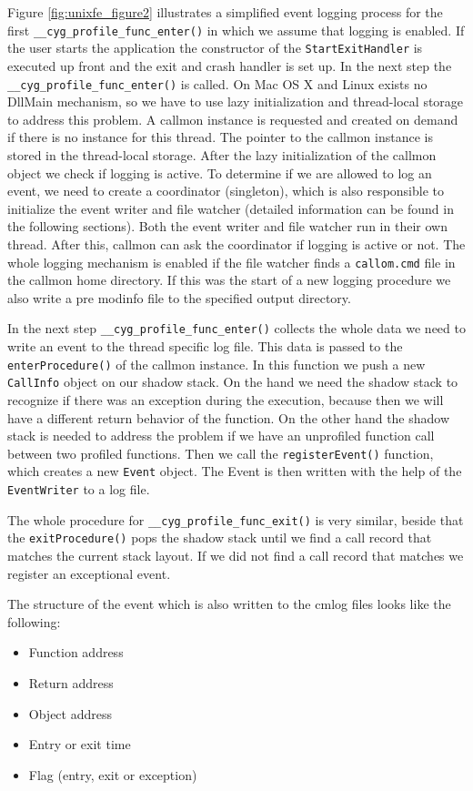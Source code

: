 Figure \ref{fig:unixfe_figure2} illustrates a simplified event logging process for the first \verb=__cyg_profile_func_enter()= in which we assume that logging is enabled. If the user starts the application the constructor of the \verb=StartExitHandler= is executed up front and the exit and crash handler is set up. In the next step the \verb=__cyg_profile_func_enter()= is called. On Mac OS X and Linux exists no DllMain mechanism, so we have to use lazy initialization and thread-local storage to address this problem. A callmon instance is requested and created on demand if there is no instance for this thread. The pointer to the callmon instance is stored in the thread-local storage. After the lazy	initialization of the callmon object we check if logging is active. To determine if we are allowed to log an event, we need to create a coordinator (singleton), which is also responsible to initialize the event writer and file watcher (detailed information can be found in the following sections). Both the event writer and file watcher run in their own thread. After this, callmon can ask the coordinator if logging is active or not. The whole logging mechanism is enabled if the file watcher finds a \verb=callom.cmd= file in the callmon home directory. If this was the start of a new logging procedure we also write a pre modinfo file to the specified output directory.

In the next step \verb=__cyg_profile_func_enter()= collects the whole data we need to write an event to the thread specific log file. This data is passed to the \verb=enterProcedure()= of the callmon instance. In this function we push a new \verb=CallInfo= object on our shadow stack. On the hand we need the shadow stack to recognize if there was an exception during the execution, because then we will have a different return behavior of the function. On the other hand the shadow stack is needed to address the problem if we have an unprofiled function call between two profiled functions. Then we call the \verb=registerEvent()= function, which creates a new \verb=Event= object. The Event is then written with the help of the \verb=EventWriter= to a log file.

The whole procedure for \verb=__cyg_profile_func_exit()= is very similar, beside that the \verb=exitProcedure()= pops the shadow stack until we find a call record that matches the current stack layout. If we did not find a call record that matches we register an exceptional event.

The structure of the event which is also written to the cmlog files looks like the following:
\begin{itemize}
	\item Function address
	\item Return address
	\item Object address
	\item Entry or exit time
	\item Flag (entry, exit or exception)
\end{itemize}

